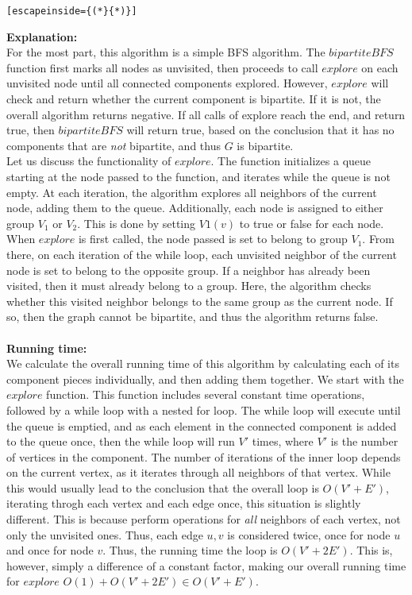 \documentclass{article}
\begin{document}
\begin{enumerate}
\begin{lstlisting}[escapeinside={(*}{*)}]
\end{lstlisting}
\textbf{Explanation:}
\\ For the most part, this algorithm is a simple BFS algorithm. The $bipartiteBFS$ function first marks all nodes as unvisited, then proceeds to call $explore$ on each unvisited node until all connected components explored. However, $explore$ will check and return whether the current component is bipartite. If it is not, the overall algorithm returns negative. If all calls of explore reach the end, and return true, then $bipartiteBFS$ will return true, based on the conclusion that it has no components that are \emph{not} bipartite, and thus $G$ is bipartite.
\\ Let us discuss the functionality of $explore$. The function initializes a queue starting at the node passed to the function, and iterates while the queue is not empty. At each iteration, the algorithm explores all neighbors of the current node, adding them to the queue. Additionally, each node is assigned to either group $V_1$ or $V_2$. This is done by setting $V1(v)$ to true or false for each node. When $explore$ is first called, the node passed is set to belong to group $V_1$. From there, on each iteration of the while loop, each unvisited neighbor of the current node is set to belong to the opposite group. If a neighbor has already been visited, then it must already belong to a group. Here, the algorithm checks whether this visited neighbor belongs to the same group as the current node. If so, then the graph cannot be bipartite, and thus the algorithm returns false. 
\\\\ \textbf{Running time:}
\\ We calculate the overall running time of this algorithm by calculating each of its component pieces individually, and then adding them together. We start with the $explore$ function. This function includes several constant time operations, followed by a while loop with a nested for loop. The while loop will execute until the queue is emptied, and as each element in the connected component is added to the queue once, then the while loop will run $V'$ times, where $V'$ is the number of vertices in the component. The number of iterations of the inner loop depends on the current vertex, as it iterates through all neighbors of that vertex. While this would usually lead to the conclusion that the overall loop is $O(V'+E')$, iterating throgh each vertex and each edge once, this situation is slightly different. This is because perform operations for \emph{all} neighbors of each vertex, not only the unvisited ones. Thus, each edge $u,v$ is considered twice, once for node $u$ and once for node $v$. Thus, the running time the loop is $O(V'+2E')$. This is, however, simply a difference of a constant factor, making our overall running time for $explore$ $O(1)+O(V'+2E')\in O(V'+E')$.

\end{enumerate}
\end{document}
